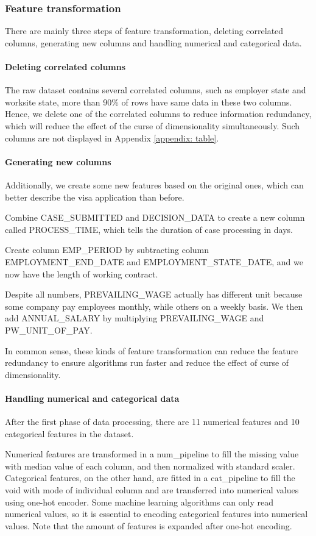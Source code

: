\subsubsection{Feature transformation}
There are mainly three steps of feature transformation, deleting correlated columns, generating new columns and handling numerical and categorical data.
\paragraph{Deleting correlated columns} 
The raw dataset contains several correlated columns, such as employer state and worksite state, more than 90\% of rows have same data in these two columns. Hence, we delete one of the correlated columns to reduce information redundancy, which will reduce the effect of the curse of dimensionality simultaneously. Such columns are not displayed in Appendix \ref{appendix: table}.
\paragraph{Generating new columns} 
Additionally, we create some new features based on the original ones, which can better describe the visa application than before. 

Combine CASE\_SUBMITTED and DECISION\_DATA to create a new column called PROCESS\_TIME, which tells the duration of case processing in days.

Create column EMP\_PERIOD by subtracting column EMPLOYMENT\_END\_DATE and EMPLOYMENT\_STATE\_DATE, and we now have the length of working contract.

Despite all numbers, PREVAILING\_WAGE actually has different unit because some company pay employees monthly, while others on a weekly basis. We then add ANNUAL\_SALARY by multiplying  PREVAILING\_WAGE and PW\_UNIT\_OF\_PAY.

In common sense, these kinds of feature transformation can reduce the feature redundancy to ensure algorithms run faster and reduce the effect of curse of dimensionality. 
\paragraph{Handling numerical and categorical data} 
After the first phase of data processing, there are 11 numerical features and 10 categorical features in the dataset.

Numerical features are transformed in a num\_pipeline to fill the missing value with median value of each column, and then normalized with standard scaler. Categorical features, on the other hand, are fitted in a cat\_pipeline to fill the void with mode of individual column and are transferred into numerical values using one-hot encoder.  Some machine learning algorithms can only read numerical values, so it is essential to encoding categorical features into numerical values. Note that the amount of features is expanded after one-hot encoding.


